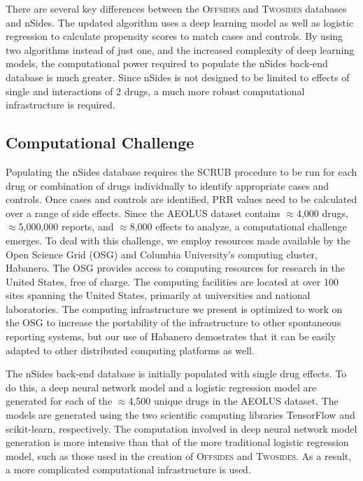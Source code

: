 \documentclass{ws-procs11x85}
\begin{document}
There are several key differences between the O\textsc{ffsides} and
T\textsc{wosides} databases and nSides. The updated algorithm uses a
deep learning model as well as logistic regression to calculate
propensity scores to match cases and controls. By using two algorithms
instead of just one, and the increased complexity of deep learning
models, the computational power required to populate the nSides
back-end database is much greater. Since nSides is not designed to be
limited to effects of single and interactions of 2 drugs, a much
more robust computational infrastructure is required.

\subsection{Computational Challenge}

Populating the nSides database requires the SCRUB procedure to be run
for each drug or combination of drugs individually to identify
appropriate cases and controls. Once cases and controls are
identified, PRR values need to be calculated over a range of side
effects. Since the AEOLUS dataset contains $\approx$4,000 drugs,
$\approx$5,000,000 reports, and $\approx$8,000 effects to analyze, a
computational challenge emerges.  To deal with this challenge, we
employ resources made available by the Open Science Grid (OSG) and
Columbia University's computing cluster, Habanero. The OSG provides
access to computing resources for research in the United States, free
of charge. The computing facilities are located at over 100 sites
spanning the United States, primarily at universities and national
laboratories. The computing infrastructure we present is optimized to work on
the OSG to increase the portability of the infrastructure to other
spontaneous reporting systems, but our use of Habanero demostrates that it can be easily adapted to other distributed computing platforms as well.

The nSides back-end database is initially populated with single drug
effects. To do this, a deep neural network model and a logistic
regression model are generated for each of the $\approx$4,500 unique
drugs in the AEOLUS dataset. The models are generated using the two scientific computing libraries
TensorFlow and scikit-learn,
respectively. The computation involved in deep neural network model
generation is more intensive than that of the more traditional logistic regression
model, such as those used in the creation of O\textsc{ffsides} and
T\textsc{wosides}. As a result, a more complicated computational
infrastructure is used.
\end{document}
